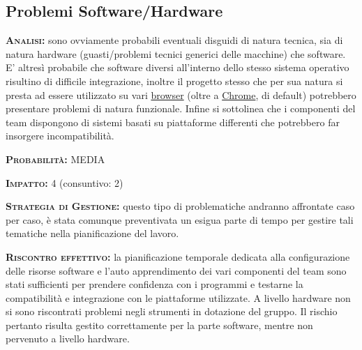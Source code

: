 \subsection{Problemi Software/Hardware}
\begin{description}
	\item{\scshape\bfseries Analisi:} sono ovviamente probabili eventuali disguidi di natura tecnica, sia di natura hardware (guasti/problemi tecnici generici delle macchine) che software. E' altresì probabile che software diversi all'interno dello stesso sistema operativo risultino di difficile integrazione, inoltre il progetto stesso che per sua natura si presta ad essere utilizzato su vari \underline{browser} (oltre a \underline{Chrome}, di default) potrebbero presentare problemi di natura funzionale. Infine si sottolinea che i componenti del team dispongono di sistemi basati su piattaforme differenti che potrebbero far insorgere incompatibilità.
	\item{\scshape\bfseries Probabilità:} MEDIA
	\item{\scshape\bfseries Impatto:} 4 (consuntivo: 2)
	\item{\scshape\bfseries Strategia di Gestione:} questo tipo di problematiche andranno affrontate caso per caso, è stata comunque preventivata un esigua parte di tempo per gestire tali tematiche nella pianificazione del lavoro.
	\item{\scshape\bfseries Riscontro effettivo:} la pianificazione temporale dedicata alla configurazione delle risorse software e l'auto apprendimento dei vari componenti del team sono stati sufficienti per prendere confidenza con i programmi e testarne la compatibilità e integrazione con le piattaforme utilizzate.
A livello hardware non si sono riscontrati problemi negli strumenti in dotazione del gruppo. Il rischio pertanto risulta gestito correttamente per la parte software, mentre non pervenuto a livello hardware.
\end{description}

